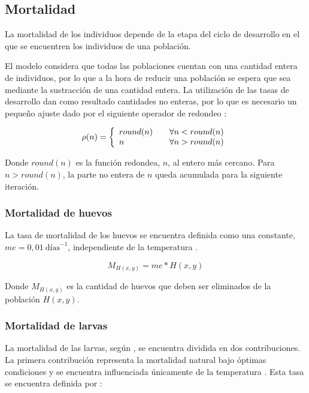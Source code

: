 \subsection{Mortalidad}
\label{subsec:cap4-mortalidad}
La mortalidad de los individuos depende de la etapa del ciclo de desarrollo en el que se encuentren
los individuos de una población.

El modelo considera que todas las poblaciones cuentan con una cantidad entera de individuos, por
lo que a la hora de reducir una población se espera que sea mediante la sustracción de una
cantidad entera. La utilización de las tasas de desarrollo dan como resultado cantidades no enteras, por lo que es necesario un pequeño ajuste dado por el siguiente operador de redondeo :

\begin{equation}
\label{eq:operador-redondeo}
\rho(n) = \left\{
\begin{array}{l l}
   round(n) & \quad  \forall n < round(n)\\
   n & \quad  \forall n > round(n)\\
\end{array} \right.
\end{equation}

Donde $round(n)$ es la función redondea, $n$, al entero más cercano. Para $n > round(n)$, la parte
no entera de $n$ queda acumulada para la siguiente iteración.

\subsubsection{Mortalidad de huevos}
La tasa de mortalidad de los huevos se encuentra definida como una constante,
$me = 0,01\ \text{días}^{-1}$, independiente de la temperatura \cite{otero2006stochastic}.

\begin{equation}
    M_{H(x,y)} = me * H(x,y)
\end{equation}

Donde $M_{H(x,y)}$ es la cantidad de huevos que deben ser eliminados de la población $H(x,y)$.

\subsubsection{Mortalidad de larvas}
La mortalidad de las larvas, según \cite{otero2006stochastic}, se encuentra dividida en dos
contribuciones. La primera contribución representa la mortalidad natural bajo óptimas condiciones
y se encuentra influenciada únicamente de la temperatura \cite{otero2006stochastic}. Esta tasa se
encuentra definida por :

